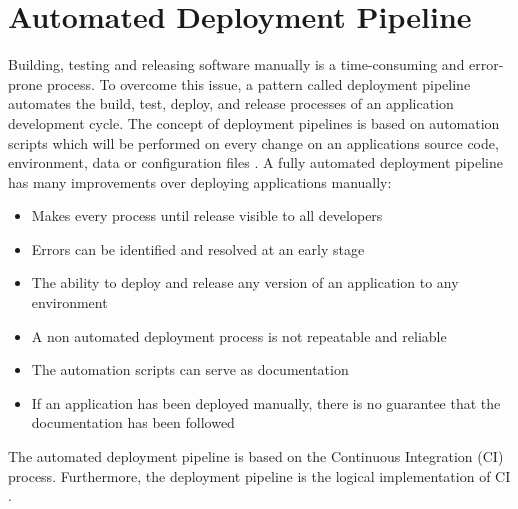 \section{Automated Deployment Pipeline}
Building, testing and releasing software manually is a time-consuming and error-prone process.
To overcome this issue, a pattern called deployment pipeline automates the build, test, deploy, and release processes of an application development cycle.
The concept of deployment pipelines is based on automation scripts which will be performed on every change on an applications source code, environment, data or configuration files \cite{Farley2010CI}.
A fully automated deployment pipeline has many improvements over deploying applications manually:
\begin{itemize}
\item Makes every process until release visible to all developers \cite{Farley2010CI}
\item Errors can be identified and resolved at an early stage \cite{Farley2010CI}
\item The ability to deploy and release any version of an application to any environment \cite{Farley2010CI}
\item A non automated deployment process is not repeatable and reliable \cite{Farley2010CI}
\item The automation scripts can serve as documentation \cite{Farley2010CI}
\item If an application has been deployed manually, there is no guarantee that the documentation has been followed \cite{Farley2010CI}
\end{itemize}
The automated deployment pipeline is based on the Continuous Integration (CI) process. Furthermore, the deployment pipeline is the logical implementation of CI \cite{Farley2010CI}.


